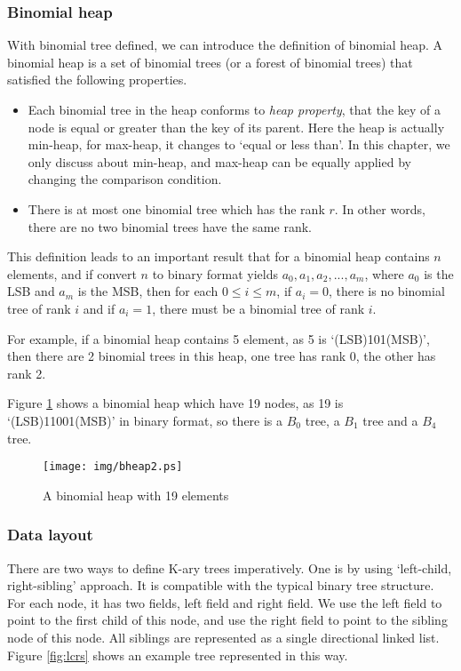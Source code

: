 \documentclass{article}
\begin{document}
\subsubsection{Binomial heap}
\label{Binomial heap} 

With binomial tree defined, we can introduce the definition of binomial heap. A binomial heap is a set of binomial trees (or a forest of binomial trees) that satisfied the following properties.

\begin{itemize}
\item Each binomial tree in the heap conforms to {\em heap property}, that the key of a node is equal or greater than the key of its parent. Here the heap is actually min-heap, for max-heap, it changes to `equal or less than'. In this chapter, we only discuss about min-heap, and max-heap can be equally applied by changing the comparison condition.
\item There is at most one binomial tree which has the rank $r$. In other words, there are no two binomial trees have the same rank.
\end{itemize}

This definition leads to an important result that for a binomial heap contains $n$ elements, and if convert $n$ to binary format yields $a_0, a_1, a_2, ..., a_m$, where $a_0$ is the LSB and $a_m$ is the MSB, then for each $0 \leq i \leq m$, if $a_i=0$, there is no binomial tree of rank $i$ and if $a_i = 1$, there must be a binomial tree of rank $i$.

For example, if a binomial heap contains 5 element, as 5 is `(LSB)101(MSB)', then there are 2 binomial trees in this heap, one tree has rank 0, the other has rank 2.

Figure \ref{fig:bheap2} shows a binomial heap which have 19 nodes, as 19 is `(LSB)11001(MSB)' in binary format, so there is a $B_0$ tree, a $B_1$ tree and a $B_4$ tree.

\begin{figure}[htbp]
  \centering
  \texttt{[image: img/bheap2.ps]}
  \caption{A binomial heap with 19 elements} \label{fig:bheap2}
\end{figure}

\subsubsection{Data layout}
There are two ways to define K-ary trees imperatively. One is by using
`left-child, right-sibling' approach\cite{CLRS}. It is compatible with
the typical binary tree structure. For each node, it has two fields,
left field and right field. We use the left field to point to the first
child of this node, and use the right field to point to the sibling
node of this node. All siblings are represented as a single directional
linked list. Figure \ref{fig:lcrs} shows an example tree represented in this way.
\end{document}
